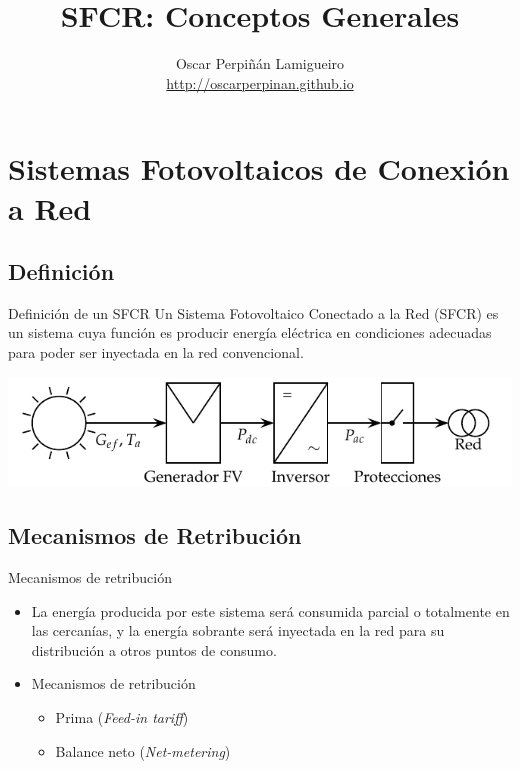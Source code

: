 \documentclass[xcolor={usenames,svgnames,dvipsnames}]{beamer}
\author{Oscar Perpiñán Lamigueiro \\ \url{http://oscarperpinan.github.io}}
\date{}
\title{SFCR: Conceptos Generales}
\begin{document}
\maketitle

\section{Sistemas Fotovoltaicos de Conexión a Red}
\label{sec-1}

\subsection{Definición}
\label{sec-1-1}

\begin{frame}[label=sec-1-1-1]{Definición de un SFCR}
Un Sistema Fotovoltaico Conectado a la Red (SFCR) es un sistema cuya
función es producir energía eléctrica en condiciones adecuadas para
poder ser inyectada en la red convencional.

\includegraphics[width=.9\linewidth]{../figs/EsquemaSFCR.pdf}
\end{frame}

\subsection{Mecanismos de Retribución}
\label{sec-1-2}
\begin{frame}[label=sec-1-2-1]{Mecanismos de retribución}
\begin{itemize}
\item La energía producida por este sistema será consumida parcial o totalmente en las cercanías, y la energía sobrante será inyectada en la red para su distribución a otros puntos de consumo.

\item Mecanismos de retribución

\begin{itemize}
\item Prima (\emph{Feed-in tariff})

\item Balance neto (\emph{Net-metering})
\end{itemize}
\end{itemize}
\end{frame}
\end{document}
